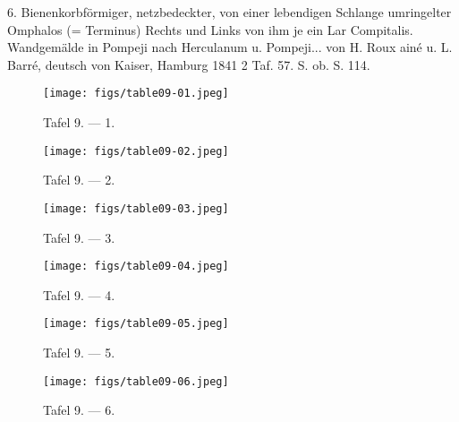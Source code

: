 \documentclass[a4paper, 11pt, oneside]{article}
\begin{document}
6. Bienenkorbförmiger, netzbedeckter, von einer lebendigen Schlange umringelter Omphalos (= Terminus) Rechts und Links von ihm je ein Lar Compitalis. Wandgemälde in Pompeji nach Herculanum u. Pompeji... von H. Roux ainé u. L. Barré, deutsch von Kaiser, Hamburg 1841 2 Taf. 57. S. ob. S. 114.
\clearpage
\vspace*{\fill}
\begin{figure}[H]
\centering
\texttt{[image: figs/table09-01.jpeg]}
\caption{\swabfamily Tafel 9. --- 1.}
\end{figure}
\vspace*{\fill}
\clearpage
\vspace*{\fill}
\begin{figure}[H]
\centering
\texttt{[image: figs/table09-02.jpeg]}
\caption{\swabfamily Tafel 9. --- 2.}
\end{figure}
\vspace*{\fill}
\clearpage
\vspace*{\fill}
\begin{figure}[H]
\centering
\texttt{[image: figs/table09-03.jpeg]}
\caption{\swabfamily Tafel 9. --- 3.}
\end{figure}
\vspace*{\fill}
\clearpage
\vspace*{\fill}
\begin{figure}[H]
\centering
\texttt{[image: figs/table09-04.jpeg]}
\caption{\swabfamily Tafel 9. --- 4.}
\end{figure}
\vspace*{\fill}
\clearpage
\vspace*{\fill}
\begin{figure}[H]
\centering
\texttt{[image: figs/table09-05.jpeg]}
\caption{\swabfamily Tafel 9. --- 5.}
\end{figure}
\vspace*{\fill}
\clearpage
\vspace*{\fill}
\begin{figure}[H]
\centering
\texttt{[image: figs/table09-06.jpeg]}
\caption{\swabfamily Tafel 9. --- 6.}
\end{figure}
\vspace*{\fill}
\clearpage
\end{document}
